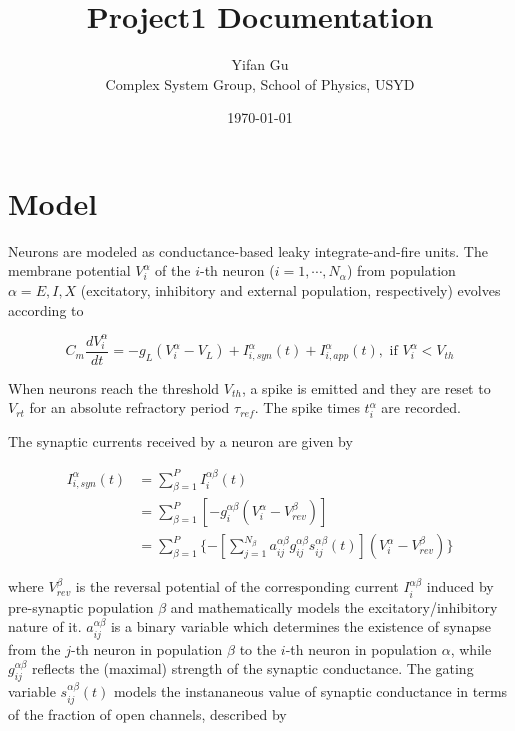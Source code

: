 \documentclass{article}
\title{Project1 Documentation}
\author{Yifan Gu  \\
	Complex System Group, School of Physics, USYD  \\
	}
\date{\today}
\begin{document}
 \maketitle


\section{Model}


Neurons are modeled as conductance-based leaky integrate-and-fire units. 
The membrane potential $V^{\alpha}_{i}$ of the $i$-th neuron ($i=1,\cdots,N_{\alpha}$) from population $\alpha=E,I,X$ (excitatory, inhibitory and external population, respectively) evolves according to

\begin{equation}
C_{m}\frac{dV^{\alpha}_{i}}{dt} = -g_{L}(V^{\alpha}_{i}-V_{L}) + I^{\alpha}_{i,syn}(t) + I^{\alpha}_{i,app}(t), \text{ if } V^{\alpha}_{i} < V_{th}
\end{equation}

When neurons reach the threshold $V_{th}$, a spike is emitted and they are reset to $V_{rt}$ for an absolute refractory period $\tau_{ref}$. 
The spike times $t^{\alpha}_{i}$ are recorded.

The synaptic currents received by a neuron are given by


\begin{align}
I^{\alpha}_{i,syn}(t) &= \sum_{\beta=1}^{P}I^{\alpha\beta}_{i}(t) \\
 &= \sum_{\beta=1}^{P}[-g_{i}^{\alpha\beta}(V^{\alpha}_{i}-V_{rev}^{\beta})] \\
 &= \sum_{\beta=1}^{P}\{-[\sum_{j=1}^{N_{\beta}}a_{ij}^{\alpha\beta}g_{ij}^{\alpha\beta}s_{ij}^{\alpha\beta}(t)](V^{\alpha}_{i}-V_{rev}^{\beta})\}\label{eq:I_syn}
\end{align}


\noindent
where $V_{rev}^{\beta}$ is the reversal potential of the corresponding current $I^{\alpha\beta}_{i}$ induced by pre-synaptic population $\beta$ and mathematically models the excitatory/inhibitory nature of it. 
$a_{ij}^{\alpha\beta}$ is a binary variable which determines the existence of synapse from the $j$-th neuron in population $\beta$ to the $i$-th neuron in  population $\alpha$, while $g_{ij}^{\alpha\beta}$ reflects the (maximal) strength of the synaptic conductance. 
The gating variable $s_{ij}^{\alpha\beta}(t)$ models the instananeous value of synaptic conductance in terms of the fraction of open channels, described by
\end{document}
